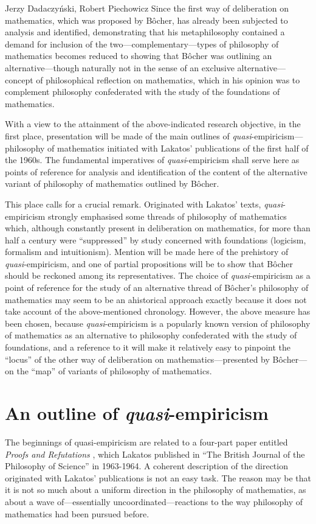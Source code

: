 \begin{artengenv}{Jerzy Dadaczyński, Robert Piechowicz}
Since the first way of deliberation on mathematics, which was proposed by Bôcher, has already been subjected to analysis and identified, demonstrating that his metaphilosophy contained a demand for inclusion of the two---complementary---types of philosophy of mathematics becomes reduced to showing that Bôcher was outlining an alternative---though naturally not in the sense of an exclusive alternative---concept of philosophical reflection on mathematics, which in his opinion was to complement philosophy confederated with the study of the foundations of mathematics.

With a view to the attainment of the above-indicated research objective, in the first place, presentation will be made of the main outlines of \textit{quasi}-empiricism---philosophy of mathematics initiated with Lakatos' publications of the first half of the 1960s. The fundamental imperatives of \textit{quasi}-empiricism shall serve here as points of reference for analysis and identification of the content of the alternative variant of philosophy of mathematics outlined by Bôcher.

This place calls for a crucial remark. Originated with Lakatos' texts, \textit{quasi}-empiricism strongly emphasised some threads of philosophy of mathematics which, although constantly present in deliberation on mathematics, for more than half a century were ``suppressed'' by study concerned with foundations (logicism, formalism and intuitionism). Mention will be made here of the prehistory of \textit{quasi}-empiricism, and one of partial propositions will be to show that Bôcher should be reckoned among its representatives. The choice of \textit{quasi}-empiricism as a point of reference for the study of an alternative thread of Bôcher's philosophy of mathematics may seem to be an ahistorical approach exactly because it does not take account of the above-mentioned chronology. However, the above measure has been chosen, because \textit{quasi}-empiricism is a popularly known version of philosophy of mathematics as an alternative to philosophy confederated with the study of foundations, and a reference to it will make it relatively easy to pinpoint the ``locus'' of the other way of deliberation on mathematics---presented by Bôcher---on the ``map'' of variants of philosophy of mathematics.

\section{An outline of \textit{quasi}-empiricism}
The beginnings of quasi-empiricism are related to a four-part paper entitled \textit{Proofs and Refutations}
\parencite[][]{lakatos_proofs_1963},
 which Lakatos published in ``The British Journal of the Philosophy of Science'' in 1963-1964. A coherent description of the direction originated with Lakatos' publications is not an easy task. The reason may be that it is not so much about a uniform direction in the philosophy of mathematics, as about a wave of---essentially uncoordinated---reactions to the way philosophy of mathematics had been pursued before.


\end{artengenv}
